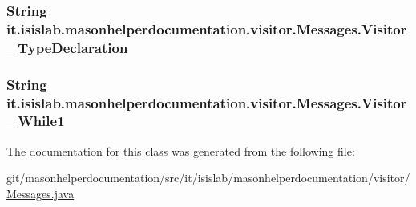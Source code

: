 \hypertarget{classit_1_1isislab_1_1masonhelperdocumentation_1_1visitor_1_1_messages_a0425f530629f22e0c518246f33aa225b}{
\subsubsection[{Visitor\-\_\-\-Type\-Declaration}]{\setlength{\rightskip}{0pt plus 5cm}String it.\-isislab.\-masonhelperdocumentation.\-visitor.\-Messages.\-Visitor\-\_\-\-Type\-Declaration\hspace{0.3cm}{\ttfamily [static]}}}\label{classit_1_1isislab_1_1masonhelperdocumentation_1_1visitor_1_1_messages_a0425f530629f22e0c518246f33aa225b}
\hypertarget{classit_1_1isislab_1_1masonhelperdocumentation_1_1visitor_1_1_messages_a8b52faa8e610a01ecd3f2dd5d43838b9}{
\subsubsection[{Visitor\-\_\-\-While1}]{\setlength{\rightskip}{0pt plus 5cm}String it.\-isislab.\-masonhelperdocumentation.\-visitor.\-Messages.\-Visitor\-\_\-\-While1\hspace{0.3cm}{\ttfamily [static]}}}\label{classit_1_1isislab_1_1masonhelperdocumentation_1_1visitor_1_1_messages_a8b52faa8e610a01ecd3f2dd5d43838b9}


The documentation for this class was generated from the following file\-:\begin{DoxyCompactItemize}
\item 
git/masonhelperdocumentation/src/it/isislab/masonhelperdocumentation/visitor/\hyperlink{visitor_2_messages_8java}{Messages.\-java}\end{DoxyCompactItemize}
